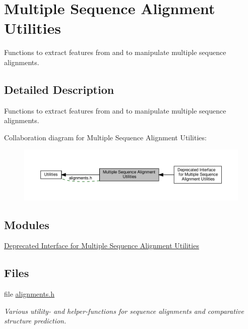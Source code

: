 \hypertarget{group__aln__utils}{}\section{Multiple Sequence Alignment Utilities}
\label{group__aln__utils}


Functions to extract features from and to manipulate multiple sequence alignments.  




\subsection{Detailed Description}
Functions to extract features from and to manipulate multiple sequence alignments. 

Collaboration diagram for Multiple Sequence Alignment Utilities\+:
\nopagebreak
\begin{figure}[H]
\begin{center}
\leavevmode
\includegraphics[width=350pt]{group__aln__utils}
\end{center}
\end{figure}
\subsection*{Modules}
\begin{DoxyCompactItemize}
\item 
\hyperlink{group__aln__utils__deprecated}{Deprecated Interface for Multiple Sequence Alignment Utilities}
\end{DoxyCompactItemize}
\subsection*{Files}
\begin{DoxyCompactItemize}
\item 
file \hyperlink{utils_2alignments_8h}{alignments.\+h}
\begin{DoxyCompactList}\small\item\em Various utility-\/ and helper-\/functions for sequence alignments and comparative structure prediction. \end{DoxyCompactList}\end{DoxyCompactItemize}
